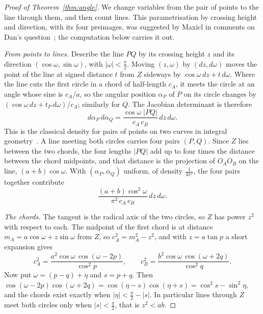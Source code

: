 \documentclass[11pt]{article}
\theoremstyle{remark}
\begin{document}
\begin{proof}[Proof of Theorem~\ref{thm:angle}]
We change variables from the pair of points to the line through them, and then count lines. This
parametrisation by crossing height and direction, with its four preimages, was suggested by Maxicl in
comments on Dan's question~\cite{Maxicl}; the computation below carries it out.

\emph{From points to lines.} Describe the line $PQ$ by its crossing height $z$ and its direction
$(\cos\omega,\sin\omega)$, with $|\omega|<\frac\pi2$. Moving $(z,\omega)$ by $(dz,d\omega)$ moves the
point of the line at signed distance $t$ from $Z$ sideways by $\cos\omega\,dz+t\,d\omega$. Where the
line cuts the first circle in a chord of half-length $c_A$, it meets the circle at an angle whose
sine is $c_A/a$, so the angular position $\alpha_P$ of $P$ on its circle changes by
$(\cos\omega\,dz+t_P\,d\omega)/c_A$; similarly for $Q$. The Jacobian determinant is therefore
\begin{equation}\label{eq:jacobian}
  d\alpha_P\,d\alpha_Q=\frac{\cos\omega\;|PQ|}{c_A\,c_B}\,dz\,d\omega .
\end{equation}
This is the classical density for pairs of points on two curves in integral
geometry~\cite{Santalo}. A line meeting both circles carries four pairs $(P,Q)$. Since $Z$ lies
between the two chords, the four lengths $|PQ|$ add up to four times the distance between the
chord midpoints, and that distance is the projection of $O_AO_B$ on the line, $(a+b)\cos\omega$.
With $(\alpha_P,\alpha_Q)$ uniform, of density $\frac1{4\pi^2}$, the four pairs together
contribute
\[
  \frac{(a+b)\cos^2\omega}{\pi^2\,c_A\,c_B}\,dz\,d\omega .
\]

\emph{The chords.} The tangent is the radical axis of the two circles, so $Z$ has power $z^2$ with
respect to each. The midpoint of the first chord is at distance $m_A=a\cos\omega+z\sin\omega$ from
$Z$, so $c_A^2=m_A^2-z^2$, and with $z=a\tan p$ a short expansion gives
\[
  c_A^2=\frac{a^2\cos\omega\,\cos(\omega-2p)}{\cos^2p},\qquad
  c_B^2=\frac{b^2\cos\omega\,\cos(\omega+2q)}{\cos^2q}.
\]
Now put $\omega=(p-q)+\eta$ and $s=p+q$. Then
$\cos(\omega-2p)\cos(\omega+2q)=\cos(\eta-s)\cos(\eta+s)=\cos^2s-\sin^2\eta$, and the chords exist
exactly when $|\eta|<\frac\pi2-|s|$. In particular lines through $Z$ meet both circles only when
$|s|<\frac\pi2$, that is $z^2<ab$.


\end{proof}
\end{document}
